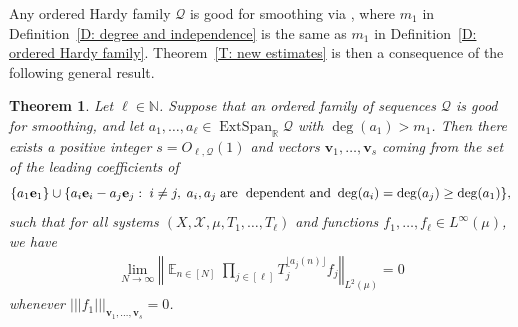 \documentclass[11pt]{amsart}
\newtheorem{theorem}[lemma]{Theorem}
\theoremstyle{definition}
\DeclareMathOperator*{\E}{\mathbb{E}}
\newcommand{\N}{{\mathbb N}}
\newcommand{\R}{{\mathbb R}}
\newcommand{\CH}{{\mathcal H}}
\newcommand{\CQ}{{\mathcal Q}}
\newcommand{\CX}{{\mathcal X}}
\newcommand{\be}{{\mathbf{e}}}
\newcommand{\bv}{{\mathbf{v}}}
\newcommand{\norm}[1]{\left\Vert #1\right\Vert}
\newcommand{\nnorm}[1]{\lvert\!|\!| #1|\!|\!\rvert}
\newcommand{\1}{{\mathbf{1}}}
\DeclareMathOperator{\Span}{Span}
\DeclareMathOperator{\extSpan}{ExtSpan}
\newcommand{\abs}[1]{\mathopen{}\left| #1\mathclose{}\right|}
\newcommand{\sfloor}[1]{{\lfloor #1 \rfloor}}
\begin{document}
    Any ordered Hardy family $\CQ$ is good for smoothing via \cite[Corollary~6.4 \& Theorem~10.2]{DKKST24},  where $m_1$ in Definition~\ref{D: degree and independence} is the same as $m_1$ in Definition~\ref{D: ordered Hardy family}. Theorem~\ref{T: new estimates} is then a consequence of the following general result.
         \begin{theorem}\label{T: new estimates general}
        Let $\ell\in\N$. Suppose that an ordered family of sequences $\CQ$ is {good for smoothing}, and let $a_1, \ldots, a_\ell\in\extSpan_\R \CQ$ with $\deg(a_{1})>m_{1}$.
        Then there exists a positive integer $s=O_{\ell, \CQ}(1)$ and vectors $\bv_{1},\dots,\bv_{s}$ coming from the set of the leading coefficients of 
        \begin{align*}
            \{a_1 \be_1\}\cup\{a_i \be_i - a_j \be_j:\; i\neq j,\; a_i, a_j\; \textrm{are\; dependent and } \deg(a_{i})=\deg(a_{j})\geq \deg(a_{1})\},
        \end{align*}
         such that for all systems $(X, \CX, \mu, T_1, \ldots, T_\ell)$ and functions $f_1, \ldots, f_\ell\in L^\infty(\mu)$, we have 
\begin{align*}%
                  \lim_{N\to\infty} %
         \norm{\E_{n\in [N]} 
         \prod_{j\in[\ell]}  T_{j}^{\sfloor{a_{j}(n)}} f_{j}}_{L^2(\mu)}=0
    \end{align*}
    whenever $\nnorm{f_1}_{\bv_{1},\dots,\bv_{s}}=0$. 
    \end{theorem}
\end{document}
